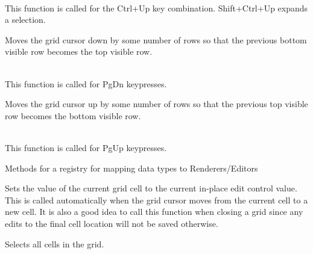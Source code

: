 \\
This function is called for the Ctrl+Up key combination. Shift+Ctrl+Up expands a selection.



\label{wxgridmovepagedown}


Moves the grid cursor down by some number of rows so that the previous bottom visible row
becomes the top visible row.

\\
This function is called for PgDn keypresses.



\label{wxgridmovepageup}


Moves the grid cursor up by some number of rows so that the previous top visible row
becomes the bottom visible row.

\\
This function is called for PgUp keypresses.



\label{wxgridregisterdatatype}


Methods for a registry for mapping data types to Renderers/Editors



\label{wxgridsaveeditcontrolvalue}


Sets the value of the current grid cell to the current in-place edit control value.
This is called automatically when the grid cursor moves from the current cell to a
new cell. It is also a good idea to call this function when closing a grid since
any edits to the final cell location will not be saved otherwise.



\label{wxgridselectall}


Selects all cells in the grid.



